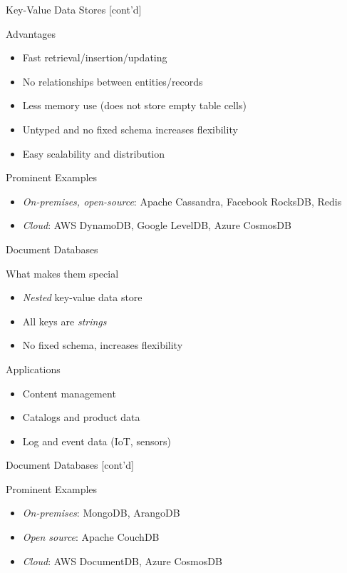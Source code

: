 \documentclass[ignorenonframetext,xcolor=x11names]{beamer}
\begin{document}
\begin{frame}[label=full]{Key-Value Data Stores \small [cont'd]}
\begin{block}{Advantages}
\begin{itemize}
	\item Fast retrieval/insertion/updating
	\item No relationships between entities/records
	\item Less memory use (does not store empty table cells)
	\item Untyped and no fixed schema increases flexibility
	\item Easy scalability and distribution
\end{itemize}
\end{block}
\begin{block}{Prominent Examples}
\begin{itemize}
	\item \emph{On-premises, open-source}: Apache Cassandra, Facebook RocksDB, Redis
	\item \emph{Cloud}: AWS DynamoDB, Google LevelDB, Azure CosmosDB
\end{itemize}
\end{block}
\end{frame}

\begin{frame}[label=full]{Document Databases}
\begin{block}{What makes them special}
\begin{itemize}
	\item \emph{Nested} key-value data store
	\item All keys are \emph{strings}
	\item No fixed schema, increases flexibility
\end{itemize}
\end{block}

\begin{block}{Applications}
\begin{itemize}
	\item Content management
	\item Catalogs and product data
	\item Log and event data (IoT, sensors)
\end{itemize}
\end{block}
\end{frame}

\begin{frame}[label=full]{Document Databases \small [cont'd]}
\begin{block}{Prominent Examples}
\begin{itemize}
	\item \emph{On-premises}: MongoDB, ArangoDB
	\item \emph{Open source}: Apache CouchDB
	\item \emph{Cloud}: AWS DocumentDB, Azure CosmosDB
\end{itemize}
\end{block}
\end{frame}
\end{document}
